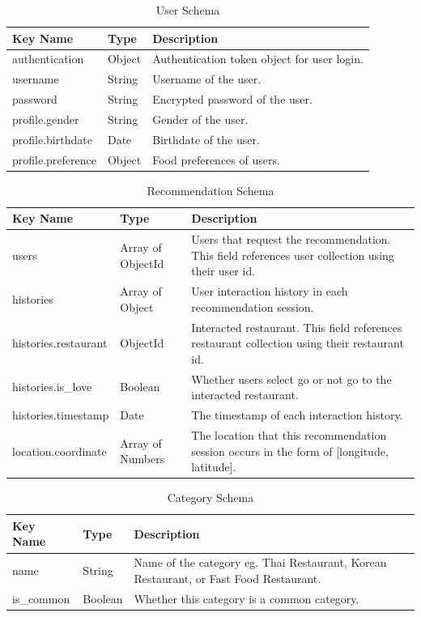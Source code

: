 \documentclass[12pt,oneside,openright,a4paper]{cpe-english-project}
\begin{document}
\begin{table}[H]
\caption{User Schema}\label{tbl:3UserSchema}
\begin{tabularx}{\textwidth}{l|l|X} \hline\hline
Key Name & Type & Description \\ \hline\hline
authentication & Object & Authentication token object for user login. \\ \hline
username & String & Username of the user. \\ \hline
password & String & Encrypted password of the user. \\ \hline
profile.gender & String & Gender of the user. \\ \hline
profile.birthdate & Date & Birthdate of the user. \\ \hline
profile.preference & Object & Food preferences of users. \\ \hline\hline
\end{tabularx}
\end{table}

\begin{table}[H]
\caption{Recommendation Schema}\label{tbl:3RecommendationSchema}
\begin{tabularx}{\textwidth}{l|l|X} \hline\hline
Key Name & Type & Description \\ \hline\hline
users & Array of ObjectId & Users that request the recommendation. This field references user collection using their user id. \\ \hline
histories & Array of Object & User interaction history in each recommendation session. \\ \hline
histories.restaurant & ObjectId & Interacted restaurant. This field references restaurant collection using their restaurant id. \\ \hline
histories.is\_love & Boolean & Whether users select go or not go to the interacted restaurant. \\ \hline
histories.timestamp & Date & The timestamp of each interaction history. \\ \hline
location.coordinate & Array of Numbers & The location that this recommendation session occurs in the form of [longitude, latitude]. \\ \hline\hline
\end{tabularx}
\end{table}

\begin{table}[H]
\caption{Category Schema}\label{tbl:3CategorySchema}
\begin{tabularx}{\textwidth}{l|l|X} \hline\hline
Key Name & Type & Description \\ \hline\hline
name & String & Name of the category eg. Thai Restaurant, Korean Restaurant, or Fast Food Restaurant. \\ \hline
is\_common & Boolean & Whether this category is a common category. \\ \hline\hline
\end{tabularx}
\end{table}
\end{document}

